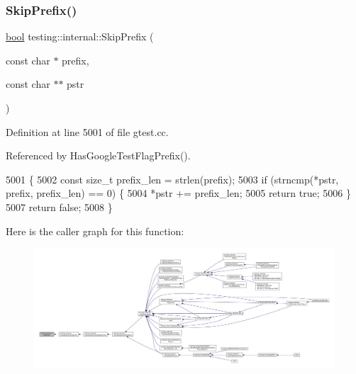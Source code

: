 \subsubsection{\texorpdfstring{Skip\+Prefix()}{SkipPrefix()}}
{\footnotesize\ttfamily \hyperlink{classbool}{bool} testing\+::internal\+::\+Skip\+Prefix (\begin{DoxyParamCaption}\item[{const char $\ast$}]{prefix,  }\item[{const char $\ast$$\ast$}]{pstr }\end{DoxyParamCaption})}



Definition at line 5001 of file gtest.\+cc.



Referenced by Has\+Google\+Test\+Flag\+Prefix().


\begin{DoxyCode}
5001                                                        \{
5002   \textcolor{keyword}{const} \textcolor{keywordtype}{size\_t} prefix\_len = strlen(prefix);
5003   \textcolor{keywordflow}{if} (strncmp(*pstr, prefix, prefix\_len) == 0) \{
5004     *pstr += prefix\_len;
5005     \textcolor{keywordflow}{return} \textcolor{keyword}{true};
5006   \}
5007   \textcolor{keywordflow}{return} \textcolor{keyword}{false};
5008 \}
\end{DoxyCode}
Here is the caller graph for this function\+:
\nopagebreak
\begin{figure}[H]
\begin{center}
\leavevmode
\includegraphics[width=350pt]{namespacetesting_1_1internal_a244d9a3765727306b597b8992ab84036_icgraph}
\end{center}
\end{figure}
\mbox{\label{namespacetesting_1_1internal_a8eb8eddf760375a490e007b20777ec56}} 
